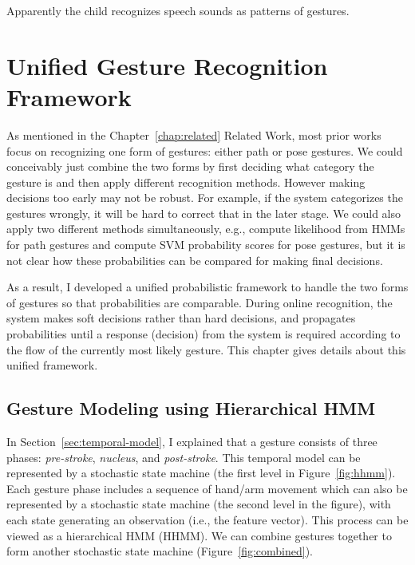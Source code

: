 \begin{savequote}
Apparently the child recognizes speech sounds as patterns of gestures.
\end{savequote}
\chapter{Unified Gesture Recognition Framework}

As mentioned in the Chapter~\ref{chap:related} Related Work, most prior works
focus on recognizing one form of gestures: either path or pose gestures.
We could conceivably just combine the two forms by first deciding what
category the gesture is and then apply different recognition methods. However making
decisions too early may not be robust. For example, if the system categorizes
the gestures wrongly, it will be hard to correct that in the later stage. We
could also apply two different methods simultaneously, e.g., compute likelihood
from HMMs for path gestures and compute SVM probability scores for pose
gestures, but it is not clear how these probabilities can be compared for making
final decisions.

As a result, I developed a unified probabilistic framework to handle the two
forms of gestures so that probabilities are comparable. During online
recognition, the system makes soft decisions rather than hard decisions, and
propagates probabilities until a response (decision)
from the system is required according to the flow of the currently most likely
gesture.
This chapter gives details about this unified framework.

\section{Gesture Modeling using Hierarchical HMM}
In Section~\ref{sec:temporal-model}, I explained that
a gesture consists of three phases: \textit{pre-stroke}, \textit{nucleus}, and \textit{post-stroke}. 
This temporal model can be represented by a stochastic state
machine (the first level in Figure~\ref{fig:hhmm}).
Each gesture phase includes a sequence of hand/arm movement which can 
also be represented by a stochastic state machine (the second level in the figure), with each state generating an
observation (i.e., the feature vector).
This process can be viewed as a hierarchical HMM (HHMM). We can combine gestures
together to form another stochastic state machine (Figure~\ref{fig:combined}).

